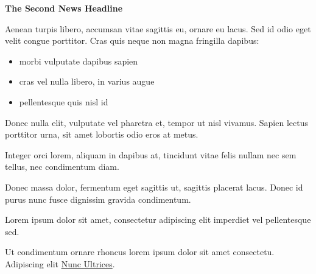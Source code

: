 \documentclass[11pt, letterpaper]{article}
\newcommand{\heading}[2]{ %
\vspace{#2} %
{\begin{center}\Large\textbf{#1}\end{center}} %
\vspace{#2} %
}
\begin{document}
\begin{minipage}[t]{.66\linewidth}
\hypertarget{secondnews}{\heading{The Second News Headline}{6pt}} %

Aenean turpis libero, accumsan vitae sagittis eu, ornare eu lacus. Sed id odio eget velit congue porttitor. Cras quis neque non magna fringilla dapibus:

\begin{itemize}
\item morbi vulputate dapibus sapien
\item cras vel nulla libero, in varius augue
\item pellentesque quis nisl id
\end{itemize}

Donec nulla elit, vulputate vel pharetra et, tempor ut nisl vivamus. Sapien lectus porttitor urna, sit amet lobortis odio eros at metus.

Integer orci lorem, aliquam in dapibus at, tincidunt vitae felis nullam nec sem tellus, nec condimentum diam.

Donec massa dolor, fermentum eget sagittis ut, sagittis placerat lacus. Donec id purus nunc fusce dignissim gravida condimentum.

Lorem ipsum dolor sit amet, consectetur adipiscing elit imperdiet vel pellentesque sed.

Ut condimentum ornare rhoncus lorem ipsum dolor sit amet consectetu. Adipiscing elit \href{http://www.example.com}{Nunc Ultrices}.

\end{minipage} %

\end{document}
